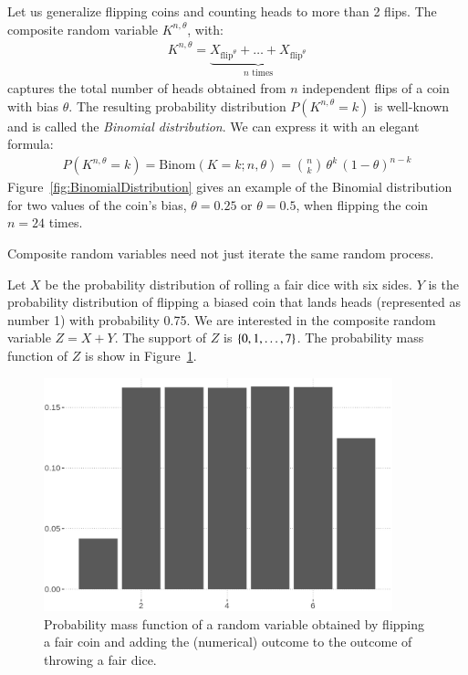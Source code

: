 \documentclass[nobib,nofonts]{tufte-handout}
\renewcommand{\markdef}[1]{\emph{#1}}
\begin{document}
\begin{example}
  Let us generalize flipping coins and counting heads to more than 2 flips.
  The composite random variable $K^{n,\theta}$, with:
  \begin{align*}
    K^{n,\theta} = \underbrace{X_{\text{flip}^{\theta}} + \dots + X_{\text{flip}^{\theta}}}_{n \text{ times}}
  \end{align*}
  captures the total number of heads obtained from $n$ independent flips of a coin with bias $\theta$.
  The resulting probability distribution $P(K^{n,\theta}=k)$ is well-known and is called the \markdef{Binomial distribution}.
  We can express it with an elegant formula:
  \begin{align*}
    P(K^{n,\theta}=k) = \text{Binom}(K = k ; n, \theta) = \binom{n}{k} \,  \theta^{k} \, (1-\theta)^{n-k}
  \end{align*}
  Figure~\ref{fig:BinomialDistribution} gives an example of the Binomial distribution for two values of the coin's bias, $\theta = 0.25$ or $\theta = 0.5$, when flipping the coin $n=24$ times.


\end{example}
Composite random variables need not just iterate the same random process.
\begin{example}
  Let $X$ be the probability distribution of rolling a fair dice with six sides.
  $Y$ is the probability distribution of flipping a biased coin that lands heads (represented as number 1) with probability 0.75.
  We are interested in the composite random variable $Z = X + Y$.
  The support of $Z$ is $\left\{0, 1, \dots, 7\right\}$.
  The probability mass function of $Z$ is show in Figure~\ref{fig:composite-RV}.
  \begin{figure}
    \centering
    \includegraphics[width=0.9\textwidth]{00-pics/05-04-mass-composite-RV.png}
    \caption{Probability mass function of a random variable obtained by flipping a fair coin and adding the (numerical) outcome to the outcome of throwing a fair dice.}
    \label{fig:composite-RV}
  \end{figure}
\end{example}
\end{document}
